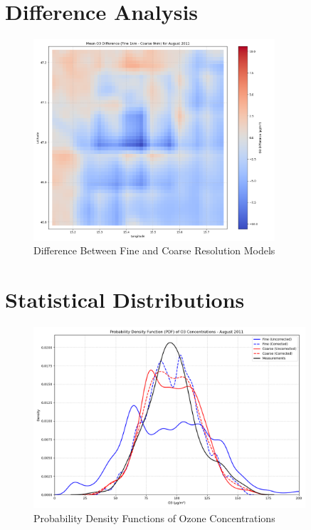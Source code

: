 \documentclass[12pt,a4paper]{article}
\begin{document}
\section{Difference Analysis}

\begin{figure}[H]
    \centering
    \includegraphics[width=0.8\textwidth]{o3_difference_august_2011.png}
    \caption{Difference Between Fine and Coarse Resolution Models}
\end{figure}

\section{Statistical Distributions}

\begin{figure}[H]
    \centering
    \includegraphics[width=0.9\textwidth]{o3_pdf_comparison_august_2011.png}
    \caption{Probability Density Functions of Ozone Concentrations}
\end{figure}
\end{document}
